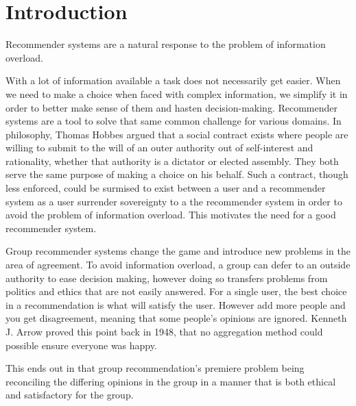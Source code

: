 \chapter{Introduction}
Recommender systems are a natural response to the problem of information overload.

With a lot of information available a task does not necessarily get easier. When we need to make a choice when faced with complex information, we simplify it in order to better make sense of them and hasten decision-making. Recommender systems are a tool to solve that same common challenge for various domains. In philosophy, Thomas Hobbes argued that a social contract exists where people are willing to submit to the will of an outer authority out of self-interest and rationality, whether that authority is a dictator or elected assembly. They both serve the same purpose of making a choice on his behalf. Such a contract, though less enforced, could be surmised to exist between a user and a recommender system as a user surrender sovereignty to a the recommender system in order to avoid the problem of information overload. This motivates the need for a good recommender system.\cite{Hobbes}

Group recommender systems change the game and introduce new problems in the area of agreement. To avoid information overload, a group can defer to an outside authority to ease decision making, however doing so transfers problems from politics and ethics that are not easily answered. For a single user, the best choice in a recommendation is what will satisfy the user. However add more people and you get disagreement, meaning that some people's opinions are ignored. Kenneth J. Arrow proved this point back in 1948, that no aggregation method could possible ensure everyone was happy.

This ends out in that group recommendation's premiere problem being reconciling the differing opinions in the group in a manner that is both ethical and satisfactory for the group.



